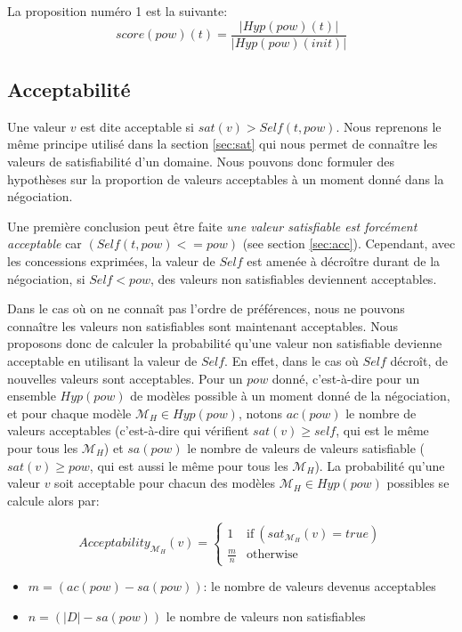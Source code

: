 \documentclass{llncs}
\begin{document}
	La proposition numéro 1 est la suivante:
	$$score(pow)(t) = \frac{|Hyp(pow)(t)|}{|Hyp(pow)(init)|}$$
	
	\subsection{Acceptabilité}
	
	Une valeur $v$ est dite acceptable si $sat(v) > Self(t, pow)$. Nous reprenons le même principe utilisé dans la section \ref{sec:sat} qui nous permet de connaître les valeurs de satisfiabilité d'un domaine. Nous pouvons donc formuler des hypothèses sur la proportion de valeurs acceptables à un moment donné dans la négociation.
	
	 Une première conclusion peut être faite \emph{une valeur \textit{satisfiable} est forcément \textit{acceptable}} car $(Self(t,pow) <= pow)$ (see section \ref{sec:acc}). Cependant, avec les concessions exprimées, la valeur de $Self$ est amenée à décroître durant de la négociation, si $Self<pow$, des valeurs non satisfiables deviennent acceptables. 

	Dans le cas où on ne connaît pas l'ordre de préférences, nous ne pouvons connaître les valeurs non satisfiables sont maintenant acceptables. Nous proposons donc de calculer la probabilité qu'une valeur non satisfiable devienne acceptable en utilisant la valeur de $Self$. En effet, dans le cas où $Self$ décroît, de nouvelles valeurs sont acceptables. Pour un $pow$ donné, c'est-à-dire pour un ensemble $Hyp(pow)$ de modèles possible à un moment donné de la négociation, et pour chaque modèle $\mathcal{M}_H\in Hyp(pow)$, notons $ac(pow)$ le nombre de valeurs acceptables (c'est-à-dire qui vérifient $sat(v)\geq self$, qui est le même pour tous les $\mathcal{M}_H$) et $sa(pow)$ le nombre de valeurs de valeurs satisfiable ($sat(v)\geq pow$, qui est aussi le même pour tous les $\mathcal{M}_H$). La probabilité qu'une valeur $v$ soit acceptable pour chacun des modèles $\mathcal{M}_H\in Hyp(pow)$ possibles se calcule alors par:
	
	
	
	
	\begin{equation}
	Acceptability_{\mathcal{M}_H}(v) =  \left\{\begin{array}{ll}
	1 & \mathrm{if\ } (sat_{\mathcal{M}_H}(v) = true)\\
	\frac{m}{n} & \mathrm{otherwise}
	\end{array}\right.
	\end{equation}
	\begin{itemize}
		\item $m= (ac(pow) - sa(pow)) $: le nombre de valeurs devenus acceptables
		\item $n= (|D| - sa(pow)) $ le nombre de valeurs non satisfiables
	\end{itemize}
	
\end{document}

